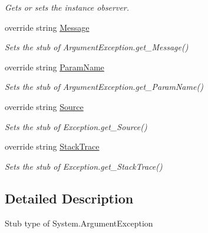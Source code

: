\begin{DoxyCompactItemize}
\begin{DoxyCompactList}\small\item\em Gets or sets the instance observer.\end{DoxyCompactList}\item 
override string \hyperlink{class_system_1_1_fakes_1_1_stub_argument_exception_a174152e4141bb8a3a4b3a52b06c981ed}{Message}
\begin{DoxyCompactList}\small\item\em Sets the stub of Argument\-Exception.\-get\-\_\-\-Message()\end{DoxyCompactList}\item 
override string \hyperlink{class_system_1_1_fakes_1_1_stub_argument_exception_ac8d395e69b20b840e72fe2812fbb633b}{Param\-Name}
\begin{DoxyCompactList}\small\item\em Sets the stub of Argument\-Exception.\-get\-\_\-\-Param\-Name()\end{DoxyCompactList}\item 
override string \hyperlink{class_system_1_1_fakes_1_1_stub_argument_exception_ae79c03360e607d0f871f5ba078dd5a18}{Source}
\begin{DoxyCompactList}\small\item\em Sets the stub of Exception.\-get\-\_\-\-Source()\end{DoxyCompactList}\item 
override string \hyperlink{class_system_1_1_fakes_1_1_stub_argument_exception_a2c7c3ccb0d0baed391ccd5b3b8e0a03a}{Stack\-Trace}
\begin{DoxyCompactList}\small\item\em Sets the stub of Exception.\-get\-\_\-\-Stack\-Trace()\end{DoxyCompactList}\end{DoxyCompactItemize}


\subsection{Detailed Description}
Stub type of System.\-Argument\-Exception



